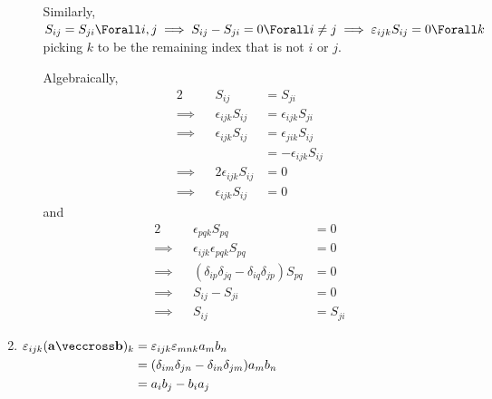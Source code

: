 \documentclass[fleqn,a4paper,11pt]{article}
\begin{document}
\begin{enumerate}[label=\textbf{\arabic*.}]
\begin{enumerate}[label=(\alph*)]
     Similarly,
     \(S_{ij} = S_{ji} \Forall i, j \implies S_{ij} - S_{ji} = 0 \Forall i \ne j
       \implies \epsilon_{ijk} S_{ij} = 0 \Forall k\) picking
     \(k\) to be the remaining index that is not \(i\) or \(j\).

     Algebraically,
     \begin{alignat*}2
      && S_{ij} &= S_{ji} \\
      \implies{}&& \epsilon_{ijk} S_{ij} &= \epsilon_{ijk} S_{ji} \\
      \implies{}&& \epsilon_{ijk} S_{ij} &= \epsilon_{jik} S_{ij} \\
      &&                                 &= -\epsilon_{ijk} S_{ij} \\
      \implies{}&& 2\epsilon_{ijk} S_{ij} &= 0 \\
      \implies{}&& \epsilon_{ijk} S_{ij} &= 0
     \end{alignat*}
     and
     \begin{alignat*}2
      && \epsilon_{pqk} S_{pq} &= 0 \\
      \implies{}&& \epsilon_{ijk} \epsilon_{pqk} S_{pq} &= 0 \\
      \implies{}&& (\delta_{ip} \delta_{jq} - \delta_{iq} \delta_{jp}) S_{pq}
       &= 0 \\
      \implies{}&& S_{ij} - S_{ji} &= 0 \\
      \implies{}&& S_{ij} &= S_{ji}
     \end{alignat*}
   \end{enumerate}
  \item \(
   \begin{aligned}[t]
    \epsilon_{ijk} (\vec a \veccross \vec b)_k
     &= \epsilon_{ijk} \epsilon_{mnk} a_m b_n \\
     &= (\delta_{im} \delta_{jn} - \delta_{in} \delta_{jm}) a_m b_n \\
     &= a_i b_j - b_i a_j
   \end{aligned} \)


\end{enumerate}
\end{document}
